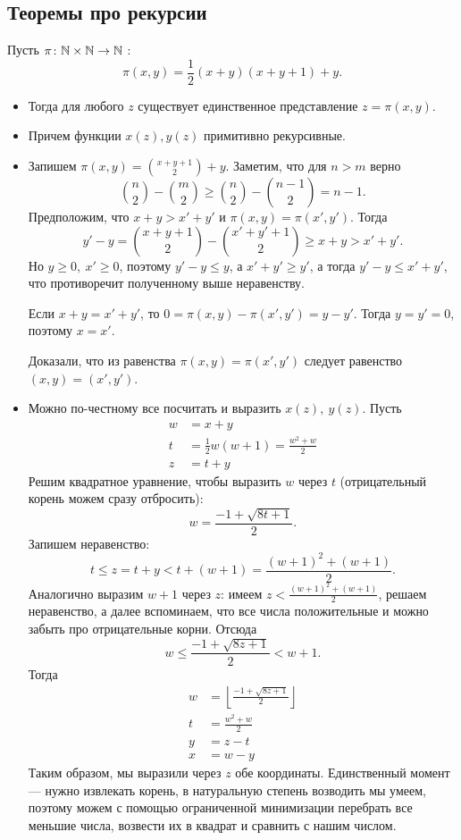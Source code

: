 \subsection{Теоремы про рекурсии}
\begin{thm}
    Пусть $ \pi\colon \mathbb{N} \times \mathbb{N} \to  \mathbb{N}$ :
	\[
		\pi(x, y) = \frac{1}{2}(x+y) (x+y+1)+y
	.\] 
	\begin{itemize}
	\item
	Тогда для любого $ z$ существует единственное представление $ z = \pi(x, y)$.
\item Причем функции $ x(z), y(z)$ примитивно рекурсивные.
	\end{itemize}
\end{thm}
\begin{proof*}
	\begin{itemize}
		\item
	Запишем $ \pi(x, y) = {{x+y+1}\choose{2}} + y$. Заметим, что для $ n > m$ верно  
	$$ {n \choose 2} - {m \choose 2} \ge {n \choose 2} - {n-1 \choose 2} = n-1.$$
	Предположим, что $ x + y >  x' + y'$ и  $ \pi(x, y) = \pi(x',y')$. Тогда
	 \[
		 y' - y = {x+y+1 \choose 2} - {x'+y'+1 \choose 2} \ge x + y > x' + y'
	.\] 
	Но $ y \ge 0, ~ x' \ge 0$,  поэтому $ y' - y \le  y$, а $ x'+y' \ge y'$, а тогда $ y' - y \le x' + y'$, что противоречит полученному выше неравенству.

	Если $ x + y = x' + y'$, то $ 0 = \pi(x, y) - \pi(x', y') = y - y'$. Тогда $ y=y'=0$, поэтому  $ x = x'$. 

	Доказали, что из равенства  $ \pi(x, y) = \pi(x', y')$ следует равенство $ (x, y)= (x', y')$.
\item  Можно по-честному все посчитать и выразить $ x(z), ~y(z)$.
	Пусть 
	\[
	\begin{aligned}
		w &= x+y \\
		t &= \frac{1}{2}w(w+1) = \frac{w^2+w}{2} \\
		z &= t +y
	\end{aligned}
	\]
	Решим квадратное уравнение, чтобы выразить $ w$ через $ t$ (отрицательный корень можем сразу отбросить):
	\[
		w = \frac{-1 + \sqrt{ 8t + 1}}{2}
	.\] 
	Запишем неравенство:
	\[
		t \le z = t + y < t + (w +1) = \frac{(w+1)^2+(w+1)}{2}
	.\] 
	Аналогично выразим $ w+1$ через $ z$: имеем $ z < \frac{(w+1)^2+(w+1)}{2}$, решаем неравенство, а далее вспоминаем, что все числа положительные и можно забыть про отрицательные корни.
	Отсюда
	\[
		w \le \frac{-1  + \sqrt{ 8z +1} }{2} < w+1
	.\] 
	Тогда 
	\[
	\begin{aligned}
		w &= \left\lfloor \frac{-1 + \sqrt{ 8z+1} }{2} \right\rfloor \\
		t &= \frac{w^2+w}{2} \\
		y &= z - t \\
		x &= w - y
	\end{aligned}
	\]
	Таким образом, мы выразили через $ z$ обе координаты. Единственный момент --- нужно извлекать корень, в натуральную степень возводить мы умеем, поэтому можем с помощью ограниченной минимизации перебрать все меньшие числа, возвести их в квадрат и сравнить с нашим числом.
	\end{itemize}
\end{proof*}


